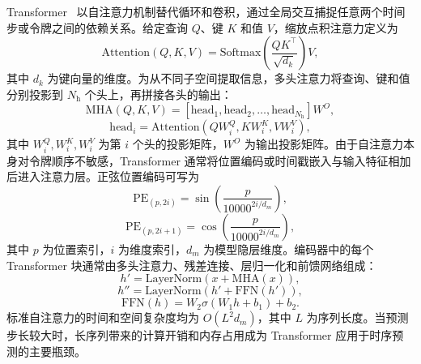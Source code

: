 Transformer~\cite{attention} 以自注意力机制替代循环和卷积，通过全局交互捕捉任意两个时间步或令牌之间的依赖关系。给定查询 $Q$、键 $K$ 和值 $V$，缩放点积注意力定义为
\begin{equation}
\mathrm{Attention}\!\left(Q, K, V\right)
=\mathrm{Softmax}\!\left(\frac{Q K^{\top}}{\sqrt{d_k}}\right) V,
\end{equation}
其中 $d_k$ 为键向量的维度。为从不同子空间提取信息，多头注意力将查询、键和值分别投影到 $N_{\mathrm{h}}$ 个头上，再拼接各头的输出：
\begin{equation}
\mathrm{MHA}\!\left(Q, K, V\right)
=\left[\mathrm{head}_1, \mathrm{head}_2, \ldots, \mathrm{head}_{N_{\mathrm{h}}}\right] W^{O},
\end{equation}
\begin{equation}
\mathrm{head}_i
=\mathrm{Attention}\!\left(Q W_i^{Q}, K W_i^{K}, V W_i^{V}\right),
\end{equation}
其中 $W_i^{Q}, W_i^{K}, W_i^{V}$ 为第 $i$ 个头的投影矩阵，$W^{O}$ 为输出投影矩阵。由于自注意力本身对令牌顺序不敏感，Transformer 通常将位置编码或时间戳嵌入与输入特征相加后进入注意力层。正弦位置编码可写为
\begin{equation}
\mathrm{PE}_{(p, 2i)} = \sin\!\left(\frac{p}{10000^{2i/d_m}}\right),
\end{equation}
\begin{equation}
\mathrm{PE}_{(p, 2i+1)} = \cos\!\left(\frac{p}{10000^{2i/d_m}}\right),
\end{equation}
其中 $p$ 为位置索引，$i$ 为维度索引，$d_m$ 为模型隐层维度。编码器中的每个 Transformer 块通常由多头注意力、残差连接、层归一化和前馈网络组成：
\begin{equation}
h' = \mathrm{LayerNorm}\!\left(x + \mathrm{MHA}\!\left(x\right)\right),
\end{equation}
\begin{equation}
h'' = \mathrm{LayerNorm}\!\left(h' + \mathrm{FFN}\!\left(h'\right)\right),
\end{equation}
\begin{equation}
\mathrm{FFN}\!\left(h\right) = W_{2} \sigma\!\left(W_{1} h + b_{1}\right) + b_{2}.
\end{equation}
标准自注意力的时间和空间复杂度均为 $O(L^{2} d_m)$，其中 $L$ 为序列长度。当预测步长较大时，长序列带来的计算开销和内存占用成为 Transformer 应用于时序预测的主要瓶颈。

